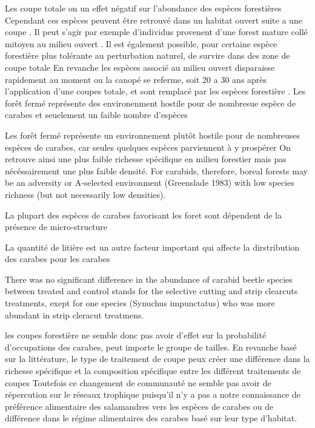 Les coupe totale on un effet négatif sur l'abondance des espèces forestières \citep{Werner2000Effectsforest,Niemela2007effectsforestry,Kudrin2023metaanalysiseffects}
Cependant ces espèces peuvent être retrouvé dans un habitat ouvert suite a une coupe \citep{Koivula2002Alternativeharvesting}.
Il peut s'agir par exemple d'individus provenent d'une forest mature collé mitoyen au milieu ouvert \citep{Spence1996Northernforestry,Koivula2002Alternativeharvesting}.
Il est également possible, pour certaine espèce forestière plus tolérante au perturbation naturel, de survire dans des zone de coupe totale \citep{Niemela2007effectsforestry}
En revanche les espèces associé au milieu ouvert disparaisse rapidement au moment ou la canopé se referme, soit 20 a 30 ans après l'application d'une coupes totale, et sont remplacé par les espèces forestière \citep{Niemela1996importancesmallscale,Koivula2002Alternativeharvesting}. 
Les forêt fermé représente des environenment hostile pour de nombresue espèce de carabes et seuelement un faible nombre d'espèces 

Les forêt fermé représente un environnement plutôt hostile pour de nombreuses espèces de carabes, car seules quelques espèces parviennent à y prospérer \citep{Koivula2002Borealcarabidbeetle}
On retrouve ainsi une plus faible richesse spécifique en milieu forestier mais pas nécéssairement une plus faible densité. 
For carabids, therefore, boreal forests may be an adversity or A-selected environment (Greenslade 1983) with low species richness (but not necessarily low densities). 


La plupart des espèces de carabes favorisant les foret sont dépendent de la présence de micro-structure \citep{Niemela1996importancesmallscale,Heliola2001Distributioncarabid,Koivula2002Alternativeharvesting,Work2004Standcomposition}

La quantité de litière est un autre facteur important qui affecte la dirstribution des carabes pour les carabes \citep{Koivula.1999Leaflitter,Heliola2001Distributioncarabid,Magura2005ImpactsLeaflitter}

\cite{mooreEffectsTwoSilvicultural2004} There was no significant difference in the abundance of carabid beetle species between treated and control stands for the selective cutting and strip clearcuts treatments, exept for one species (Synuchus impunctatus) who was more abundant in strip cleracut treatmens.


les coupes forestière ne semble donc pas avoir d'effet sur la probabilité d'occupations des carabes, peut importe le groupe de tailles. 
En revanche basé sur la littérature, le type de traitement de coupe peux créer une différence dans la richesse spécifique et la composition spécifique entre les différent traitements de coupes 
Toutefois ce changement de communauté ne semble pas avoir de répercution sur le réseaux trophique puisqu'il n'y a pas a notre connaissance de préférence alimentaire des salamandres vers les espèces de carabes ou de différence dans le régime alimentaires des carabes basé sur leur type d'habitat.

